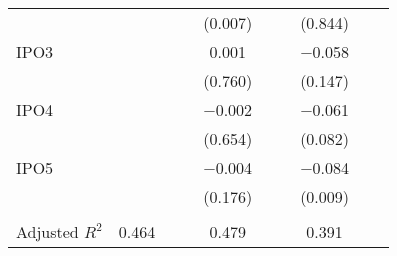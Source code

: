 \begin{longtable}{l*{9}{c}}
                    &            &            &            &     (0.007)&            &            &     (0.844)&            &            \\
\addlinespace
IPO3                &            &            &            &       0.001&            &            &    $-$0.058&            &            \\
                    &            &            &            &     (0.760)&            &            &     (0.147)&            &            \\
\addlinespace
IPO4                &            &            &            &    $-$0.002&            &            &    $-$0.061&            &            \\
                    &            &            &            &     (0.654)&            &            &     (0.082)&            &            \\
\addlinespace
IPO5                &            &            &            &    $-$0.004&            &            &    $-$0.084&            &            \\
                    &            &            &            &     (0.176)&            &            &     (0.009)&            &            \\
\\
Adjusted $ R^{2}$   &       0.464&            &            &       0.479&            &            &       0.391&            &            \\
\bottomrule
\end{longtable}
